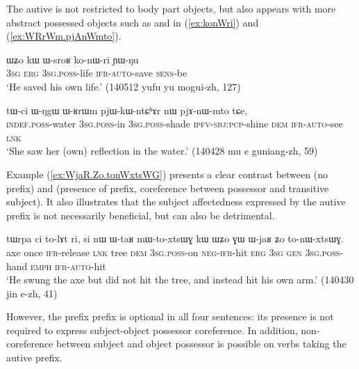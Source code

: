 The autive is not restricted to body part objects, but also appears with more abstract possessed objects such as  and  in (\ref{ex:konWri}) and (\ref{ex:WRrWm.pjAnWmto}).

\begin{exe}
\ex \label{ex:konWri}
\gll ɯʑo kɯ ɯ-sroʁ ko-nɯ-ri ɲɯ-ŋu \\
\textsc{3sg} \textsc{erg} \textsc{3sg}.\textsc{poss}-life \textsc{ifr}-\textsc{auto}-save \textsc{sens}-be \\
\glt `He saved his own life.' (140512 yufu yu mogui-zh, 127)
\end{exe}

\begin{exe}
\ex \label{ex:WRrWm.pjAnWmto}
\gll tɯ-ci ɯ-ŋgɯ ɯ-ʁrɯm pjɯ-kɯ-ntɕʰɤr nɯ pjɤ-nɯ-mto tɕe,  \\
\textsc{indef}.\textsc{poss}-water \textsc{3sg}.\textsc{poss}-in \textsc{3sg}.\textsc{poss}-shade \textsc{ipfv}-\textsc{sbj}:\textsc{pcp}-shine \textsc{dem} \textsc{ifr}-\textsc{auto}-see \textsc{lnk} \\
\glt `She saw her (own) reflection in the water.' (140428 mu e guniang-zh, 59)
\end{exe}

Example (\ref{ex:WjaR.Zo.tonWxtsWG}) presents a clear contrast between  (no  prefix) and  (presence of  prefix, coreference between possessor and transitive subject). It also illustrates that the subject affectedness expressed by the autive prefix is not necessarily beneficial, but can also be detrimental. 

\begin{exe}
\ex \label{ex:WjaR.Zo.tonWxtsWG}
\gll tɯrpa ci to-lɤt ri, si nɯ ɯ-taʁ mɯ-to-xtsɯɣ kɯ ɯʑo ɣɯ ɯ-jaʁ ʑo to-nɯ-xtsɯɣ. \\
axe once \textsc{ifr}-release \textsc{lnk} tree \textsc{dem} \textsc{3sg}.\textsc{poss}-on \textsc{neg}-\textsc{ifr}-hit \textsc{erg} \textsc{3sg} \textsc{gen} \textsc{3sg}.\textsc{poss}-hand \textsc{emph} \textsc{ifr}-\textsc{auto}-hit \\
\glt `He swung the axe but did not hit the tree, and instead hit his own arm.' (140430 jin e-zh, 41)
\end{exe}

However, the   prefix prefix is optional in all four sentences: its presence is not required to express subject-object possessor coreference. In addition, non-coreference between subject and object possessor is possible on verbs  taking the autive prefix.

